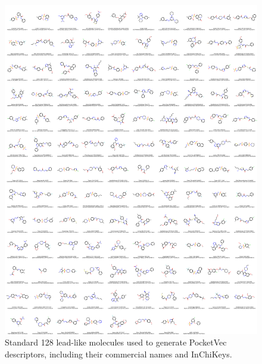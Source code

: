 \begin{figure}[htbp]
  \centering
  \includegraphics[width=0.9\linewidth]{figures/PocketVec/Supplementary/FigS8_v2.png}
  \caption{
  Standard 128 lead-like molecules used to generate PocketVec descriptors, including their commercial names and InChiKeys.
  }
  \label{FigS8_v2}
\end{figure}

